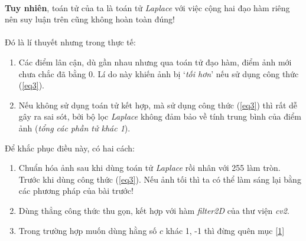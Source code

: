 \documentclass{article}
\begin{document}
    \\ \textbf{Tuy nhiên}, toán tử của ta là toán tử \textit{Laplace} với việc cộng hai đạo hàm riêng nên suy luận trên cũng không hoàn toàn đúng!
    \\ \\
    Đó là lí thuyết nhưng trong thực tế:
    \begin{enumerate}
        \item Các điểm lân cận, dù gần nhau nhưng qua toán tử đạo hàm, điểm ảnh mới chưa chắc đã bằng 0. Lí do này khiến ảnh bị `\emph{tối hơn}' nếu sử dụng công thức (\ref{eq3}).
        \item Nếu không sử dụng toán tử kết hợp, mà sử dụng công thức (\ref{eq3}) thì rất dễ gây ra sai sót, bởi bộ lọc \textit{Laplace} không đảm bảo về tính trung bình của điểm ảnh (\textit{tổng các phần tử khác 1}).
    \end{enumerate}
    Để khắc phục điều này, có hai cách:
    \begin{enumerate}
        \item Chuẩn hóa ảnh sau khi dùng toán tử \textit{Laplace} rồi nhân với 255 làm tròn. Trước khi dùng công thức (\ref{eq3}). Nếu ảnh tối thì ta có thể làm sáng lại bằng các phương pháp của bài trước!
        \item Dùng thẳng công thức thu gọn, kết hợp với hàm \emph{filter2D} của thư viện \emph{cv2}.
        \item Trong trường hợp muốn dùng hằng số $c$ khác 1, -1 thì đừng quên mục \ref{1}
    \end{enumerate}
\end{document}

